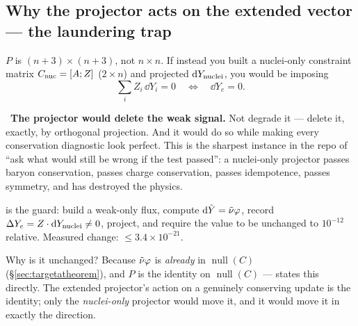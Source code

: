\subsection{Why the projector acts on the extended vector --- the laundering
            trap}
\label{sec:laundering}

$P$ is $(n{+}3) \times (n{+}3)$, not $n \times n$. If instead you built a
nuclei-only constraint matrix $C_{\rm nuc} = [A; Z]$ ($2 \times n$) and
projected $\mathrm{d} Y_{\rm nuclei}$, you would be imposing
%
\begin{equation}
\sum_i Z_i\,\dd Y_i = 0 \quad\Longleftrightarrow\quad \dd Y_e = 0 .
\label{eq:launder}
\end{equation}

\begin{warn}
\warnglyph{}~\textbf{The projector would delete the weak signal.} Not degrade it
--- delete it, exactly, by orthogonal projection. And it would do so while
making every conservation diagnostic look perfect. This is the sharpest instance
in the repo of ``ask what would still be wrong if the test passed'': a
nuclei-only projector passes baryon conservation, passes charge conservation,
passes idempotence, passes symmetry, and has destroyed the physics.
\end{warn}

 is the guard: build a
weak-only flux, compute $\mathrm{d}\tilde Y = \tilde\nu\varphi$, record
$\Delta Y_{e} = Z\cdot \mathrm{d} Y_{\rm nuclei} \ne 0$, project, and require the value to be
unchanged to $10^{-12}$ relative. Measured change: $\le 3.4\times10^{-21}$.

Why is it unchanged? Because $\tilde\nu\varphi$ is \emph{already} in
$\operatorname{null}(C)$ (\S\ref{sec:targetatheorem}), and $P$ is the identity on
$\operatorname{null}(C)$ --- 
states this directly. The extended projector's action on a genuinely conserving
update is the identity; only the \emph{nuclei-only} projector would move it, and
it would move it in exactly the \dYe{} direction.

